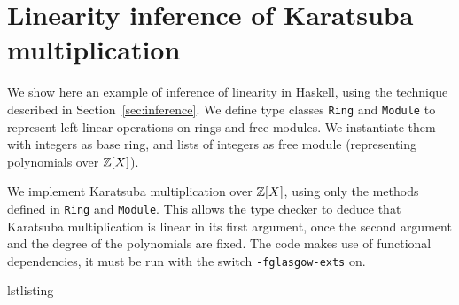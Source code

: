

\chapter{Linearity inference of Karatsuba multiplication}
\label{cha:line-infer-karats}

\lstset{language=haskell}

We show here an example of inference of linearity in Haskell, using
the technique described in Section~\ref{sec:inference}. We define type
classes \lstinline{Ring} and \lstinline{Module} to represent
left-linear operations on rings and free modules. We instantiate them
with integers as base ring, and lists of integers as free module
(representing polynomials over $\mathbb{Z}[X]$).

We implement Karatsuba multiplication over $\mathbb{Z}[X]$, using only the
methods defined in \lstinline{Ring} and \lstinline{Module}. This
allows the type checker to deduce that Karatsuba multiplication is
linear in its first argument, once the second argument and the degree
of the polynomials are fixed. The code makes use of functional
dependencies, it must be run with the switch \verb|-fglasgow-exts| on.

\begin{xcomment}{lstlisting}

\end{xcomment}


                  

%
